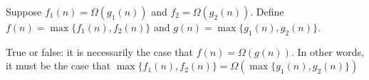 \begin{prob}
    Suppose $f_1(n) = \Omega(g_1(n))$ and $f_2 = \Omega(g_2(n))$.
    Define $f(n) = \max \{ f_1(n), f_2(n) \}$ and $g(n) = \max \{ g_1(n), g_2(n)\}$.

    True or false: it is necessarily the case that $f(n) = \Omega(g(n))$.
    In other words, it must be the case that
    $
    \max \{ f_1(n), f_2(n) \} = \Omega ( \max\{ g_1(n), g_2(n) \} )
    $

     \Tf{}
\end{prob}
